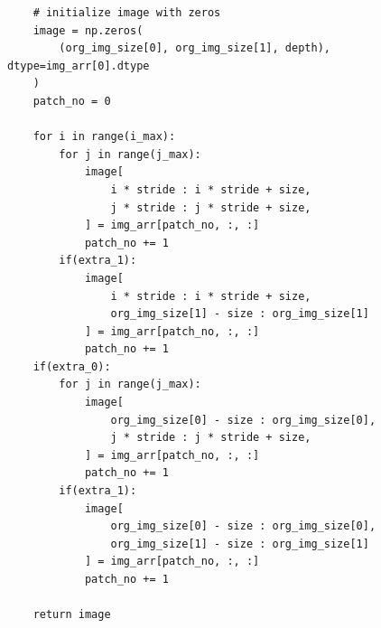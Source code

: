 \documentclass[12pt, a4paper]{report}
\begin{document}
\begin{verbatim}
    # initialize image with zeros
    image = np.zeros(
        (org_img_size[0], org_img_size[1], depth), dtype=img_arr[0].dtype
    )
    patch_no = 0

    for i in range(i_max):
        for j in range(j_max):
            image[
                i * stride : i * stride + size,
                j * stride : j * stride + size,
            ] = img_arr[patch_no, :, :]
            patch_no += 1
        if(extra_1):
            image[
                i * stride : i * stride + size,
                org_img_size[1] - size : org_img_size[1]
            ] = img_arr[patch_no, :, :]
            patch_no += 1
    if(extra_0):
        for j in range(j_max):
            image[
                org_img_size[0] - size : org_img_size[0],
                j * stride : j * stride + size,
            ] = img_arr[patch_no, :, :]
            patch_no += 1
        if(extra_1):
            image[
                org_img_size[0] - size : org_img_size[0],
                org_img_size[1] - size : org_img_size[1]
            ] = img_arr[patch_no, :, :]
            patch_no += 1

    return image
\end{verbatim}
\end{document}
